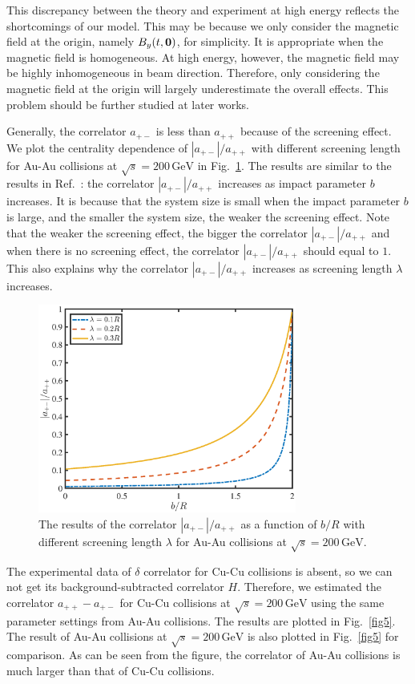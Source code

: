 \documentclass[preprint]{elsarticle}
\begin{document}
This discrepancy between the theory and experiment at high energy reflects the shortcomings of our model. This may be because we only consider the magnetic field at the origin, namely $B_y(t,\vb{0})$, for simplicity. It is appropriate when the magnetic field is homogeneous. At high energy, however, the magnetic field may be highly inhomogeneous in beam direction. Therefore, only considering the magnetic field at the origin will largely underestimate the overall effects. This problem should be further studied at later works.

Generally, the correlator $a_{+-}$ is less than $a_{++}$ because of the screening effect. We plot the centrality dependence of $|a_{+-}|/a_{++}$ with different screening length for Au-Au collisions at $\sqrt{s} = 200\,\mathrm{GeV}$ in Fig.~\ref{fig4}. The results are similar to the results in Ref.~\cite{Kharzeev:2007jp}: the correlator $|a_{+-}|/a_{++}$ increases as impact parameter $b$ increases. It is because that the system size is small when the impact parameter $b$ is large, and the smaller the system size, the weaker the screening effect. Note that the weaker the screening effect, the bigger the correlator $|a_{+-}|/a_{++}$ and when there is no screening effect, the correlator $|a_{+-}|/a_{++}$ should equal to $1$. This also explains why the correlator $|a_{+-}|/a_{++}$ increases as screening length $\lambda$ increases.


\begin{figure}
\centering
\includegraphics[width=8.5cm]{fig4.eps}
\caption{\label{fig4}The results of the correlator $|a_{+-}|/a_{++}$ as a function of $b/R$ with different screening length $\lambda$ for Au-Au collisions at $\sqrt{s} = 200\,\mathrm{GeV}$.}
\end{figure}

The experimental data of $\delta$ correlator for Cu-Cu collisions is absent, so we can not get its background-subtracted correlator $H$. Therefore, we estimated the correlator $a_{++} - a_{+-}$ for Cu-Cu collisions at $\sqrt{s} = 200\,\mathrm{GeV}$ using the same parameter settings from Au-Au collisions. The results are plotted in Fig.~\ref{fig5}. The result of Au-Au collisions at $\sqrt{s} = 200\,\mathrm{GeV}$ is also plotted in Fig.~\ref{fig5} for comparison. As can be seen from the figure, the correlator of Au-Au collisions is much larger than that of Cu-Cu collisions.
\end{document}
